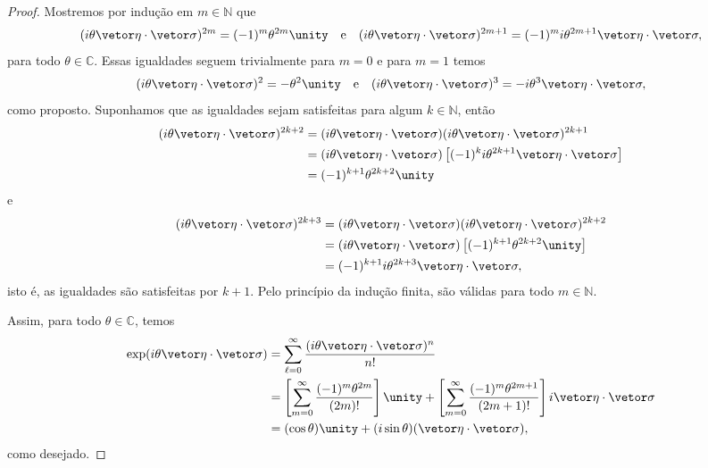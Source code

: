\begin{proof}
    Mostremos por indução em \(m \in \mathbb{N}\) que
    \begin{equation*}
        (i\theta\vetor \eta \cdot \vetor \sigma)^{2m} = (-1)^m\theta^{2m}\unity\quad\text{e}\quad(i\theta\vetor \eta \cdot \vetor \sigma)^{2m+1} = (-1)^{m}i\theta^{2m+1}\vetor \eta \cdot \vetor \sigma,
    \end{equation*}
    para todo \(\theta \in \mathbb{C}\). Essas igualdades seguem trivialmente para \(m = 0\) e para \(m = 1\) temos
    \begin{equation*}
        (i\theta \vetor \eta\cdot \vetor \sigma)^2 = - \theta^2 \unity\quad\text{e}\quad(i\theta\vetor\eta\cdot\vetor\sigma)^3 = -i\theta^3 \vetor \eta \cdot \vetor \sigma,
    \end{equation*}
    como proposto. Suponhamos que as igualdades sejam satisfeitas para algum \(k \in \mathbb{N}\), então
    \begin{align*}
        (i\theta\vetor \eta \cdot \vetor \sigma)^{2k+2} &= (i\theta\vetor \eta \cdot \vetor \sigma)(i\theta\vetor \eta \cdot \vetor \sigma)^{2k+1}\\
                                                    &= (i\theta\vetor \eta \cdot \vetor \sigma)\left[(-1)^ki\theta^{2k+1}\vetor \eta\cdot \vetor \sigma\right]\\
                                                    &= (-1)^{k+1}\theta^{2k+2} \unity
    \end{align*}
    e
    \begin{align*}
        (i\theta\vetor \eta \cdot \vetor \sigma)^{2k+3} &= (i\theta\vetor \eta \cdot \vetor \sigma)(i\theta\vetor \eta \cdot \vetor \sigma)^{2k+2}\\
                                                    &= (i\theta\vetor \eta \cdot \vetor \sigma)\left[(-1)^{k+1}\theta^{2k+2} \unity\right]\\
                                                    &= (-1)^{k+1}i\theta^{2k+3}\vetor \eta \cdot \vetor \sigma,
    \end{align*}
    isto é, as igualdades são satisfeitas por \(k + 1\). Pelo princípio da indução finita, são válidas para todo \(m \in \mathbb{N}\).

    Assim, para todo \(\theta \in \mathbb{C}\), temos
    \begin{align*}
        \exp(i\theta \vetor \eta \cdot \vetor \sigma) &= \sum_{\ell = 0}^{\infty} \frac{(i \theta \vetor \eta \cdot \vetor \sigma)^n}{n!}\\
                                                  &= \left[\sum_{m = 0}^{\infty} \frac{(-1)^{m}\theta^{2m}}{(2m)!}\right] \unity + \left[\sum_{m=0}^\infty\frac{(-1)^m \theta^{2m+1}}{(2m+1)!}\right] i \vetor \eta \cdot \vetor \sigma\\
                                                  &= (\cos\theta)\unity + (i\sin\theta)(\vetor \eta \cdot \vetor \sigma),
    \end{align*}
    como desejado.
\end{proof}
